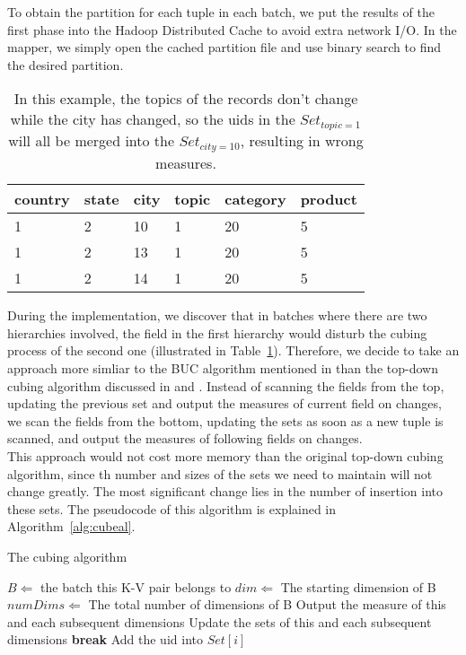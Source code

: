 \documentclass{article}
\begin{document}
To obtain the partition for each tuple in each batch, we put the results of the first phase into the Hadoop Distributed Cache to avoid extra network I/O. In the mapper, we simply open the cached partition file and use binary search to find the desired partition.

\begin{table}[h]
\centering
\begin{tabular}{l l l l l l}
country & state & city & topic & category & product \\
\hline
1 & 2 & 10 & 1 & 20 & 5 \\
1 & 2 & 13 & 1 & 20 & 5 \\
1 & 2 & 14 & 1 & 20 & 5

\end{tabular}
\caption{In this example, the topics of the records don't change while the city has changed, so the uids in the $Set_{topic=1}$ will all be merged into the $Set_{city=10}$, resulting in wrong measures.}
\label{table:interrupt}
\end{table}

During the implementation, we discover that in batches where there are two hierarchies involved, the field in the first hierarchy would disturb the cubing process of the second one (illustrated in Table~\ref{table:interrupt}). Therefore, we decide to take an approach more simliar to the BUC algorithm mentioned in \cite{beyer1999bottom} than the top-down cubing algorithm discussed in \cite{agarwal1996computation} and \cite{zhao1997array}. Instead of scanning the fields from the top, updating the previous set and output the measures of current field on changes, we scan the fields from the bottom, updating the sets as soon as a new tuple is scanned, and output the measures of following fields on changes. 
\\
This approach would not cost more memory than the original top-down cubing algorithm, since th number and sizes of the sets we need to maintain will not change greatly. The most significant change lies in the number of insertion into these sets. The pseudocode of this algorithm is explained in Algorithm~\ref{alg:cubeal}.

\begin{algorithm}[H]
\centering
\caption{The cubing algorithm}
\label{alg:cubeal}
\begin{algorithmic}[1]  
	\State $B \Leftarrow$ the batch this K-V pair belongs to
	\State $dim \Leftarrow$ The starting dimension of B
	\State $numDims \Leftarrow$ The total number of dimensions of B
			\State Output the measure of this and each subsequent dimensions
			\State Update the sets of this and each subsequent dimensions
			\State \textbf{break}
		\Else
			\State Add the uid into $Set[i]$
		\EndIf
	\EndFor
\EndFor   
\end{algorithmic}  
\end{algorithm}
\end{document}

